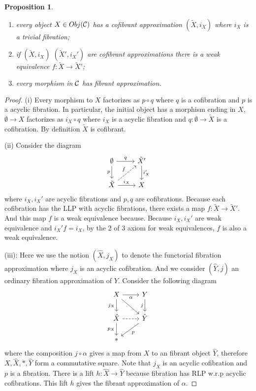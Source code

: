 \documentclass[11pt]{article}
\newtheorem{prop}[thm]{Proposition}
\newcommand{\calc}{{\cal C}}
\newcommand{\lrta}{\longrightarrow}
\begin{document}
\begin{prop}
\begin{enumerate}[label=(\roman*)]
\item every object $X\in Obj(\calc)$ has a cofibrant approximation $(\tilde{X},i_X)$ where $i_X$ is a trivial fibration;
\item if $(\tilde{X},i_X)$ $(\tilde{X}',i_X
')$ are cofibrant approximations there is a weak equivalence $f:\tilde{X}\lrta \tilde{X}'$;
\item every morphism in $\calc$ has fibrant approximation.
\end{enumerate}
\end{prop}
\begin{proof}
(i) Every morphism to $X$ factorizes as $p\circ q$ where $q$ is a cofibration and $p$ is a acyclic fibration. In particular, the initial object has a morphism ending in $X$, $\emptyset\lrta X$ factorizes as $i_X\circ q$ where $i_X$ is a acyclic fibration and $q:\emptyset\lrta \tilde{X}$ is a  cofibration.  By definition $\tilde{X}$ is cofibrant.

(ii) Consider the diagram
$$
\begin{tikzcd}
\emptyset \arrow[d, "p"'] \arrow[r, "q"] & \tilde{X}' \arrow[d, "i_{X}'"] \\
\tilde{X} \arrow[r, "i_X"] \arrow[ru, "f", dashed] & X
\end{tikzcd}
$$
where $i_X,i_X'$ are acyclic fibrations and $p,q$ are cofibrations. Because each  cofibration has the LLP with acyclic fibrations, there exists a map $f: \tilde{X}\lrta \tilde{X}'$. And this map $f$ is a weak equivalence because. Because $i_X, i_X'$ are weak equivalence and $i_X'f=i_X$, by the 2 of 3 axiom for weak equivalences, $f$ is also a weak equivalence.

(iii): Here we use the notion $(\hat{X},j_X)$ to denote the functorial fibration approximation where $j_X$ is an acyclic cofibration. And we consider $(\hat{Y},j)$ an ordinary fibration approximation of $Y$. Consider the following diagram
$$
\begin{tikzcd}
X \arrow[r, "\alpha"'] \arrow[d, "j_X"'] \arrow[rd] & Y \arrow[d, "j"'] \\
\hat{X} \arrow[r, dashed] \arrow[d, "p_X"'] & \hat{Y} \arrow[ld, "p"] \\
* & 
\end{tikzcd}
$$
where the composition $j\circ \alpha$ gives a map from $X$ to an fibrant object $\hat{Y}$, therefore $X,\hat{X},*, \hat{Y}$ form a  commutative square. Note that $j_X$ is an acyclic cofibration and $p$ is a fibration. There is a lift $h:\hat{X}\lrta \hat{Y}$ because fibration has RLP w.r.p acyclic cofibrations. This lift $h$ gives the fibrant approximation of $\alpha$.
\end{proof}
\end{document}
